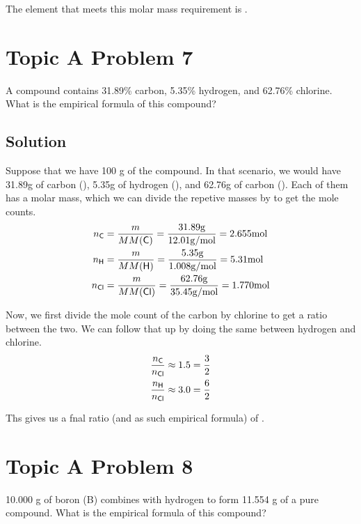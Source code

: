 \documentclass[10pt]{article}
\begin{document}
            The element that meets this molar mass requirement is . 

    \pagebreak
    \section{Topic A Problem 7}
        A compound contains 31.89\% carbon, 5.35\% hydrogen, and 62.76\% chlorine. 
        What is the empirical formula of this compound?
        
        \subsection{Solution}
            Suppose that we have 100 \unit{\gram} of the compound.
            In that scenario, we would have 31.89\unit{\gram} of carbon (), 5.35\unit{\gram} of hydrogen (), and 62.76\unit{\gram} of carbon (). 
            Each of them has a molar mass, which we can divide the repetive masses by to get the mole counts.
            \begin{align}
                n_{\ce{C}}  &=  \frac{m}{MM(\ce{C})}
                    =   \frac{31.89\unit{\gram}}{12.01 \unit{\gram/\mole}}
                    =   2.655 \unit{\mole}\\
                n_{\ce{H}}  &=  \frac{m}{MM(\ce{H})}
                    =   \frac{5.35\unit{\gram}}{1.008 \unit{\gram/\mole}}
                    =   5.31 \unit{\mole}\\
                n_{\ce{Cl}}  &=  \frac{m}{MM(\ce{Cl})}
                    =   \frac{62.76\unit{\gram}}{35.45 \unit{\gram/\mole}}
                    =   1.770 \unit{\mole}
            \end{align}

            Now, we first divide the mole count of the carbon by chlorine to get a ratio between the two.
            We can follow that up by doing the same between hydrogen and chlorine.
            \begin{align}
                \frac{n_{\ce{C}}}{n_{\ce{Cl}}}  &\approx    1.5 =   \frac{3}{2}\\
                \frac{n_{\ce{H}}}{n_{\ce{Cl}}}  &\approx    3.0 =   \frac{6}{2}
            \end{align}

            Ths gives us a fnal ratio (and as such empirical formula) of .

    \pagebreak
    \section{Topic A Problem 8}
        10.000 g of boron (B) combines with hydrogen to form 11.554 g of a pure compound. 
        What is the empirical formula of this compound?
            
\end{document}
